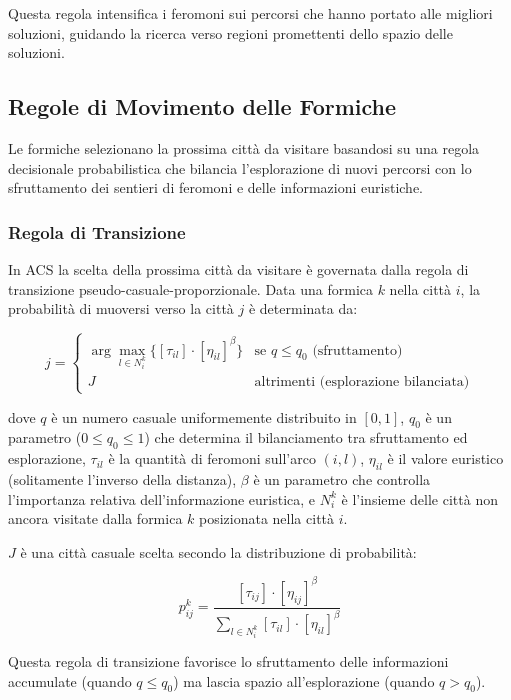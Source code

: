 Questa regola intensifica i feromoni sui percorsi che hanno portato alle migliori soluzioni, guidando la ricerca verso regioni promettenti dello spazio delle soluzioni.

\subsection{Regole di Movimento delle Formiche}

Le formiche selezionano la prossima città da visitare basandosi su una regola decisionale probabilistica che bilancia l'esplorazione di nuovi percorsi con lo sfruttamento dei sentieri di feromoni e delle informazioni euristiche.

\subsubsection{Regola di Transizione}
In \gls{ACS} la scelta della prossima città da visitare è governata dalla regola di transizione pseudo-casuale-proporzionale. Data una formica $k$ nella città $i$, la probabilità di muoversi verso la città $j$ è determinata da:

\[
	j = \begin{cases}
		\arg\max_{l \in N_i^k} \{[\tau_{il}] \cdot [\eta_{il}]^\beta\} & \text{se }q \leq q_0 \text{ (sfruttamento)} \\
		J                                                              & \text{altrimenti (esplorazione bilanciata)}
	\end{cases}
\]

dove $q$ è un numero casuale uniformemente distribuito in $[0,1]$, $q_0$ è un parametro ($0 \le q_0 \le 1$) che determina il bilanciamento tra sfruttamento ed esplorazione, $\tau_{il}$ è la quantità di feromoni sull'arco $(i,l)$, $\eta_{il}$ è il valore euristico (solitamente l'inverso della distanza), $\beta$ è un parametro che controlla l'importanza relativa dell'informazione euristica, e $N_i^k$ è l'insieme delle città non ancora visitate dalla formica $k$ posizionata nella città $i$.

$J$ è una città casuale scelta secondo la distribuzione di probabilità:

\[
	p_{ij}^k = \frac{[\tau_{ij}] \cdot [\eta_{ij}]^\beta}{\sum_{l \in N_i^k} [\tau_{il}] \cdot [\eta_{il}]^\beta}
\]

Questa regola di transizione favorisce lo sfruttamento delle informazioni accumulate (quando $q \leq q_0$) ma lascia spazio all'esplorazione (quando $q > q_0$).


